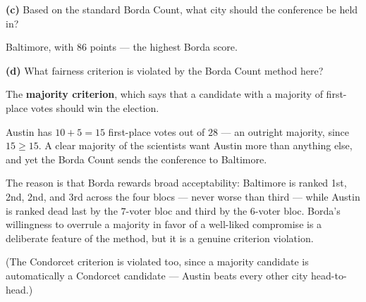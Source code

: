 \documentclass[12pt]{ximera}
\begin{document}
\begin{problem}
\begin{prompt}
\textbf{(c)} Based on the standard Borda Count, what city should the conference be held
in?

\begin{multipleChoice}
\end{multipleChoice}

\begin{feedback}
Baltimore, with $86$ points --- the highest Borda score.
\end{feedback}
\end{prompt}

\begin{prompt}
\textbf{(d)} What fairness criterion is violated by the Borda Count method here?

\begin{multipleChoice}
\end{multipleChoice}

\begin{feedback}
The \textbf{majority criterion}, which says that a candidate with a majority of
first-place votes should win the election.

Austin has $10+5 = 15$ first-place votes out of $28$ --- an outright majority, since
$15 \ge 15$. A clear majority of the scientists want Austin more than anything else,
and yet the Borda Count sends the conference to Baltimore.

The reason is that Borda rewards broad acceptability: Baltimore is ranked 1st, 2nd,
2nd, and 3rd across the four blocs --- never worse than third --- while Austin is
ranked dead last by the $7$-voter bloc and third by the $6$-voter bloc. Borda's
willingness to overrule a majority in favor of a well-liked compromise is a deliberate
feature of the method, but it is a genuine criterion violation.

(The Condorcet criterion is violated too, since a majority candidate is automatically a
Condorcet candidate --- Austin beats every other city head-to-head.)
\end{feedback}
\end{prompt}
\end{problem}
\end{document}
